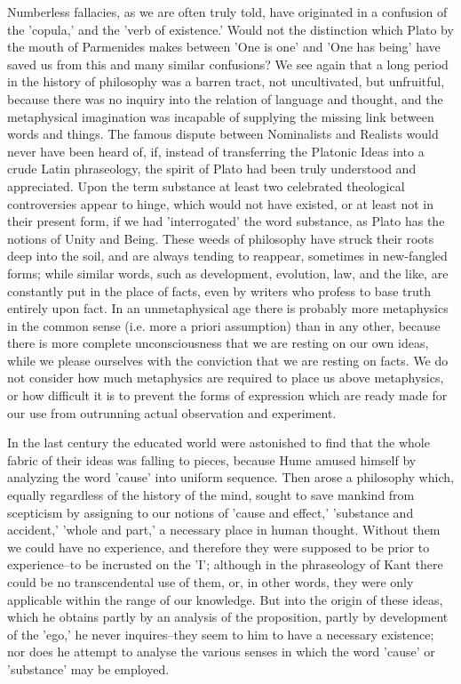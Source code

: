 Numberless fallacies, as we are often truly told, have originated in a
confusion of the 'copula,' and the 'verb of existence.' Would not the
distinction which Plato by the mouth of Parmenides makes between 'One
is one' and 'One has being' have saved us from this and many similar
confusions? We see again that a long period in the history of philosophy
was a barren tract, not uncultivated, but unfruitful, because there
was no inquiry into the relation of language and thought, and the
metaphysical imagination was incapable of supplying the missing link
between words and things. The famous dispute between Nominalists and
Realists would never have been heard of, if, instead of transferring the
Platonic Ideas into a crude Latin phraseology, the spirit of Plato had
been truly understood and appreciated. Upon the term substance at least
two celebrated theological controversies appear to hinge, which would
not have existed, or at least not in their present form, if we had
'interrogated' the word substance, as Plato has the notions of Unity and
Being. These weeds of philosophy have struck their roots deep into
the soil, and are always tending to reappear, sometimes in new-fangled
forms; while similar words, such as development, evolution, law, and
the like, are constantly put in the place of facts, even by writers who
profess to base truth entirely upon fact. In an unmetaphysical age there
is probably more metaphysics in the common sense (i.e. more a
priori assumption) than in any other, because there is more complete
unconsciousness that we are resting on our own ideas, while we please
ourselves with the conviction that we are resting on facts. We do
not consider how much metaphysics are required to place us above
metaphysics, or how difficult it is to prevent the forms of expression
which are ready made for our use from outrunning actual observation and
experiment.

In the last century the educated world were astonished to find that the
whole fabric of their ideas was falling to pieces, because Hume amused
himself by analyzing the word 'cause' into uniform sequence. Then arose
a philosophy which, equally regardless of the history of the mind,
sought to save mankind from scepticism by assigning to our notions
of 'cause and effect,' 'substance and accident,' 'whole and part,'
a necessary place in human thought. Without them we could have
no experience, and therefore they were supposed to be prior to
experience--to be incrusted on the 'I'; although in the phraseology of
Kant there could be no transcendental use of them, or, in other words,
they were only applicable within the range of our knowledge. But into
the origin of these ideas, which he obtains partly by an analysis of the
proposition, partly by development of the 'ego,' he never inquires--they
seem to him to have a necessary existence; nor does he attempt to
analyse the various senses in which the word 'cause' or 'substance' may
be employed.

